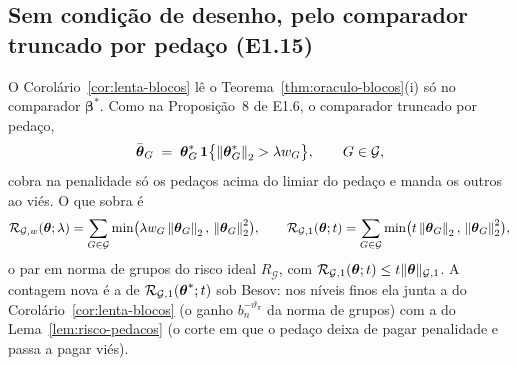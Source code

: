 \documentclass[11pt,a4paper]{article}
\newcommand{\bbeta}{\boldsymbol{\beta}}
\newcommand{\betastar}{\bbeta^{*}}
\newcommand{\thbar}{\bar{\btheta}}
\newcommand{\Gcal}{\mathcal{G}}
\newcommand{\bn}{b_{n}}
\newcommand{\nGone}[1]{\lVert #1\rVert_{\mathcal{G},1}}
\newcommand{\Rid}{R_{\mathcal{G}}}
\begin{document}
\subsection*{Sem condição de desenho, pelo comparador truncado por pedaço (E1.15)}

O Corolário~\ref{cor:lenta-blocos} lê o
Teorema~\ref{thm:oraculo-blocos}(i) só no comparador $\betastar$. Como na
Proposição~8 de E1.6, o comparador truncado por pedaço,
\begin{equation}
  \label{eq:truncado-blocos}
  \thbar_{G} \;=\; \thetastar_{G}\,\mathbf{1}\bigl\{\norm{\thetastar_{G}}_{2} > \pen w_{G}\bigr\},
  \qquad G \in \Gcal,
\end{equation}
cobra na penalidade só os pedaços acima do limiar do pedaço e manda os
outros ao viés. O que sobra é
\begin{equation}
  \label{eq:RG}
  \mathcal{R}_{\Gcal,w}(\btheta;\pen) = \sum_{G\in\Gcal}
  \min\bigl(\pen w_{G}\norm{\btheta_{G}}_{2},\,\norm{\btheta_{G}}_{2}^{2}\bigr),
  \qquad
  \mathcal{R}_{\Gcal,1}(\btheta;t) = \sum_{G\in\Gcal}
  \min\bigl(t\norm{\btheta_{G}}_{2},\,\norm{\btheta_{G}}_{2}^{2}\bigr),
\end{equation}
o par em norma de grupos do risco ideal $\Rid$, com
$\mathcal{R}_{\Gcal,1}(\btheta;t) \le t\nGone{\btheta}$. A contagem nova é a
de $\mathcal{R}_{\Gcal,1}(\thetastar;t)$ sob Besov: nos níveis finos ela junta
a do Corolário~\ref{cor:lenta-blocos} (o ganho $\bn^{-\vartheta_{\pi}}$ da
norma de grupos) com a do Lema~\ref{lem:risco-pedacos} (o corte em que o
pedaço deixa de pagar penalidade e passa a pagar viés).
\end{document}
